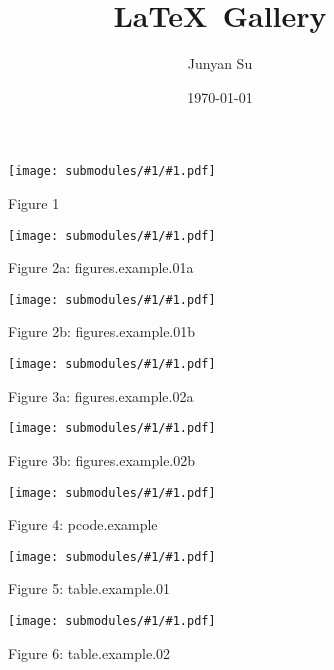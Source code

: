 \documentclass{article}
\title{\LaTeX\, Gallery}
\author{Junyan Su}
\date{\today}
\begin{document}
\maketitle

\newcommand{\includeSubmodule}[2]{
    \begin{figure}[ht]
        \begin{center}
            \texttt{[image: submodules/\#1/\#1.pdf]}
        \end{center} 
        \caption*{Figure #1#2}
    \end{figure}
}
\includeSubmodule{1}{}
\includeSubmodule{2a}{: figures.example.01a}
\includeSubmodule{2b}{: figures.example.01b}
\includeSubmodule{3a}{: figures.example.02a}
\includeSubmodule{3b}{: figures.example.02b}
\includeSubmodule{4}{: pcode.example}
\includeSubmodule{5}{: table.example.01}
\includeSubmodule{6}{: table.example.02}



%
%
\end{document}
